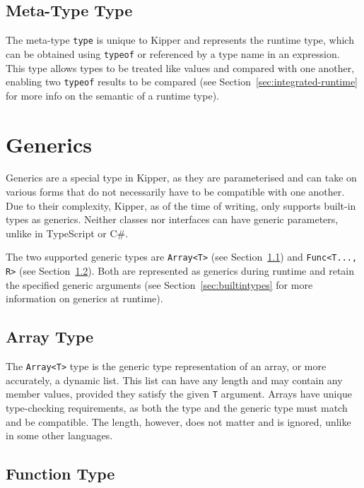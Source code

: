 \subsection{Meta-Type Type}

The meta-type \lstinline|type| is unique to Kipper and represents the runtime type, which can be obtained using \lstinline|typeof| or referenced by a type name in an expression. This type allows types to be treated like values and compared with one another, enabling two \lstinline|typeof| results to be compared (see Section~\ref{sec:integrated-runtime} for more info on the semantic of a runtime type).

\section{Generics}
\label{sec:kipper-generics}

Generics are a special type in Kipper, as they are parameterised and can take on various forms that do not necessarily have to be compatible with one another. Due to their complexity, Kipper, as of the time of writing, only supports built-in types as generics. Neither classes nor interfaces can have generic parameters, unlike in TypeScript or C\#.

The two supported generic types are \lstinline|Array<T>| (see Section~\ref{sec:array-type}) and \lstinline|Func<T..., R>| (see Section~\ref{sec:func-type}). Both are represented as generics during runtime and retain the specified generic arguments (see Section~\ref{sec:builtintypes} for more information on generics at runtime).

\subsection{Array Type}
\label{sec:array-type}

The \lstinline|Array<T>| type is the generic type representation of an array, or more accurately, a dynamic list. This list can have any length and may contain any member values, provided they satisfy the given \lstinline|T| argument. Arrays have unique type-checking requirements, as both the type and the generic type must match and be compatible. The length, however, does not matter and is ignored, unlike in some other languages.

\subsection{Function Type}
\label{sec:func-type}

